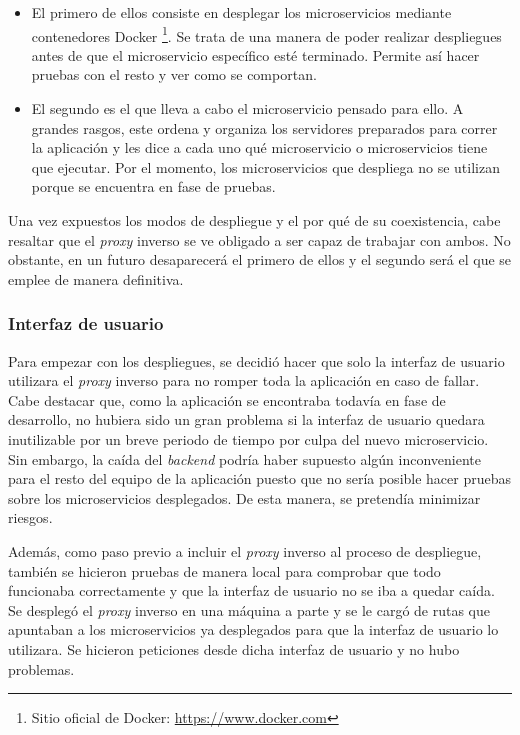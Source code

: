 \documentclass[11pt,spanish,listoffigures]{tfgetsinf}
\begin{document}
\begin{itemize}

	\item El primero de ellos consiste en desplegar los microservicios mediante contenedores Docker \footnote{Sitio oficial de Docker: \url{https://www.docker.com}}. Se trata de una manera de poder realizar despliegues antes de que el microservicio específico esté terminado. Permite así hacer pruebas con el resto y ver como se comportan.

	\item El segundo es el que lleva a cabo el microservicio pensado para ello. A grandes rasgos, este ordena y organiza los servidores preparados para correr la aplicación y les dice a cada uno qué microservicio o microservicios tiene que ejecutar. Por el momento, los microservicios que despliega no se utilizan porque se encuentra en fase de pruebas.

\end{itemize}

Una vez expuestos los modos de despliegue y el por qué de su coexistencia, cabe resaltar que el \emph{proxy} inverso se ve obligado a ser capaz de trabajar con ambos. No obstante, en un futuro desaparecerá el primero de ellos y el segundo será el que se emplee de manera definitiva.


			\subsubsection{Interfaz de usuario}

Para empezar con los despliegues, se decidió hacer que solo la interfaz de usuario utilizara el \emph{proxy} inverso para no romper toda la aplicación en caso de fallar. Cabe destacar que, como la aplicación se encontraba todavía en fase de desarrollo, no hubiera sido un gran problema si la interfaz de usuario quedara inutilizable por un breve periodo de tiempo por culpa del nuevo microservicio. Sin embargo, la caída del \emph{backend} podría haber supuesto algún inconveniente para el resto del equipo de la aplicación puesto que no sería posible hacer pruebas sobre los microservicios desplegados. De esta manera, se pretendía minimizar riesgos.

Además, como paso previo a incluir el \emph{proxy} inverso al proceso de despliegue, también se hicieron pruebas de manera local para comprobar que todo funcionaba correctamente y que la interfaz de usuario no se iba a quedar caída. Se desplegó el \emph{proxy} inverso en una máquina a parte y se le cargó de rutas que apuntaban a los microservicios ya desplegados para que la interfaz de usuario lo utilizara. Se hicieron peticiones desde dicha interfaz de usuario y no hubo problemas.
\end{document}
